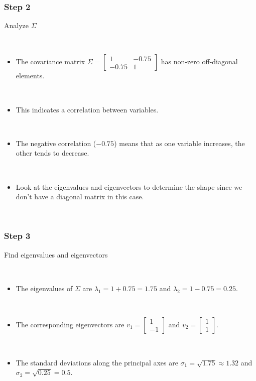 \documentclass{article}
\begin{document}
\subsubsection*{Step 2}
\parbox{\textwidth}{Analyze $\Sigma$}\\
\begin{itemize}
    \item \parbox{\textwidth}{The covariance matrix $\Sigma = \begin{bmatrix} 1 & -0.75 \\ -0.75 & 1 \end{bmatrix}$ has non-zero off-diagonal elements.}\\
    \item \parbox{\textwidth}{This indicates a correlation between variables.}\\
    \item \parbox{\textwidth}{The negative correlation ($-0.75$) means that as one variable increases, the other tends to decrease.}\\
    \item \parbox{\textwidth}{Look at the eigenvalues and eigenvectors to determine the shape since we don't have a diagonal matrix in this case.}\\
\end{itemize}

\subsubsection*{Step 3}
\parbox{\textwidth}{Find eigenvalues and eigenvectors}\\ 
\begin{itemize}
    \item \parbox{\textwidth}{The eigenvalues of $\Sigma$ are $\lambda_1 = 1 + 0.75 = 1.75$ and $\lambda_2 = 1 - 0.75 = 0.25$.}\\
    \item \parbox{\textwidth}{The corresponding eigenvectors are $v_1 = \begin{bmatrix} 1 \\ -1 \end{bmatrix}$ and $v_2 = \begin{bmatrix} 1 \\ 1 \end{bmatrix}$.}\\
    \item \parbox{\textwidth}{The standard deviations along the principal axes are $\sigma_1 = \sqrt{1.75} \approx 1.32$ and $\sigma_2 = \sqrt{0.25} = 0.5$.}\\
\end{itemize}
\end{document}
